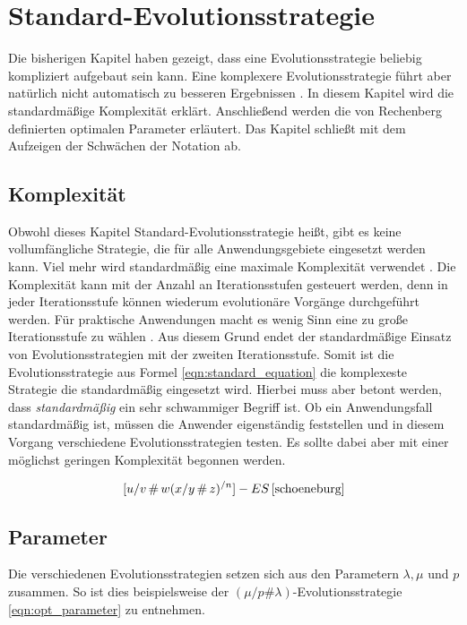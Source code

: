 
\section{Standard-Evolutionsstrategie}
Die bisherigen Kapitel haben gezeigt, dass eine Evolutionsstrategie beliebig kompliziert aufgebaut sein kann. Eine komplexere Evolutionsstrategie führt aber natürlich nicht automatisch zu besseren Ergebnissen \cite[S.~165]{schoeneburg}.
In diesem Kapitel wird die standardmäßige Komplexität erklärt. Anschließend werden die von Rechenberg definierten optimalen Parameter erläutert. Das Kapitel schließt mit dem Aufzeigen der Schwächen der Notation ab.

\subsection{Komplexität}
Obwohl dieses Kapitel Standard-Evolutionsstrategie heißt, gibt es keine vollumfängliche Strategie, die für alle Anwendungsgebiete eingesetzt werden kann. Viel mehr wird standardmäßig eine maximale Komplexität verwendet \cite[S.~165]{schoeneburg}.
Die Komplexität kann mit der Anzahl an Iterationsstufen gesteuert werden, denn in jeder Iterationsstufe können wiederum evolutionäre Vorgänge durchgeführt werden.
Für praktische Anwendungen macht es wenig Sinn eine zu große Iterationsstufe zu wählen \cite[S.~165]{schoeneburg}. Aus diesem Grund endet der standardmäßige Einsatz von Evolutionsstrategien mit der zweiten Iterationsstufe.
Somit ist die Evolutionsstrategie aus Formel \ref{eqn:standard_equation} die komplexeste Strategie die standardmäßig eingesetzt wird. Hierbei muss aber betont werden, dass \textit{standardmäßig} ein sehr schwammiger Begriff ist. 
Ob ein Anwendungsfall standardmäßig ist, müssen die Anwender eigenständig feststellen und in diesem Vorgang verschiedene Evolutionsstrategien testen. Es sollte dabei aber mit einer möglichst geringen Komplexität begonnen werden.

\begin{equation}
\label{eqn:standard_equation}
[u/v\,\#\,w (x/y\,\#\,z)^{/n}]-ES\, \cite[S.~165]{schoeneburg}
\end{equation}

\subsection{Parameter}
Die verschiedenen Evolutionsstrategien setzen sich aus den Parametern $\lambda, \mu$ und $p$ zusammen. So ist dies beispielsweise der $(\mu / p \# \lambda)$-Evolutionsstrategie \ref{eqn:opt_parameter} zu entnehmen.

